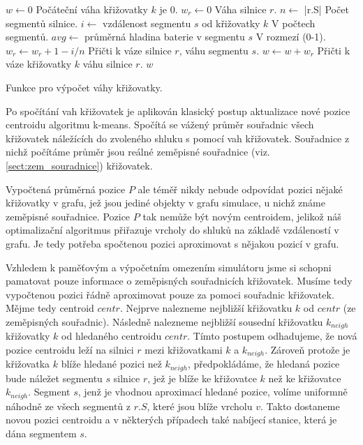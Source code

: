 \begin{algorithm}
\begin{algorithmic}
    \State $w \gets 0$ \Comment Počáteční váha křižovatky $k$ je 0.
        \State $w_r \gets 0$ \Comment Váha silnice $r$.
        \State $n \gets$ |r.S| \Comment Počet segmentů silnice.
            \State $i \gets$ vzdálenost segmentu $s$ od křižovatky $k$ \Comment V počtech segmentů.
            \State $avg \gets$ průměrná hladina baterie v segmentu $s$ \Comment V rozmezí (0-1).
            \State $w_r \gets w_r + 1 - i / n$ \Comment Přičti k váze silnice $r$, váhu segmentu $s$.
        \EndFor
        \State $w \gets w + w_r$ \Comment Přičti k váze křižovatky $k$ váhu silnice $r$.
    \EndFor
    \State \Return $w$

\EndFunction
\end{algorithmic}
\caption{Funkce pro výpočet váhy křižovatky.}
\label{alg:vert_weight}
\end{algorithm}


Po spočítání vah křižovatek je aplikován klasický postup aktualizace nové pozice 
centroidu algoritmu k-means. Spočítá se vážený průměr souřadnic všech křižovatek 
náležících do zvoleného shluku s pomocí vah křižovatek. Souřadnice z nichž 
počítáme průměr jsou reálné zeměpisné souřadnice (viz. \cref{sect:zem_souradnice}) 
křižovatek. 

Vypočtená průměrná pozice $P$ ale téměř nikdy nebude odpovídat pozici nějaké křižovatky
v grafu, jež jsou jediné objekty v grafu simulace, u nichž známe zeměpisné souřadnice.
Pozice $P$ tak nemůže být novým centroidem, jelikož náš optimalizační algoritmus
přiřazuje vrcholy do shluků na základě vzdáleností v grafu. Je tedy potřeba 
spočtenou pozici aproximovat s nějakou pozicí v grafu.

Vzhledem k paměťovým a výpočetním omezením simulátoru jsme si schopni pamatovat
pouze informace o zeměpisných souřadnicích křižovatek. Musíme tedy vypočtenou pozici 
řádně aproximovat pouze za pomoci souřadnic křižovatek. Mějme tedy centroid $centr$.
Nejprve nalezneme nejbližší křižovatku $k$ od $centr$ (ze zeměpisných souřadnic).
Následně nalezneme nejbližší sousední křižovatku $k_{neigh}$ křižovatky $k$ od
hledaného centroidu $centr$. Tímto postupem odhadujeme, že nová pozice centroidu 
leží na silnici $r$ mezi křižovatkami $k$ a $k_{neigh}$. Zároveň protože 
je křižovatka $k$ blíže hledané pozici než $k_{neigh}$, předpokládáme, že
hledaná pozice bude náležet segmentu $s$ silnice $r$, jež je blíže ke křižovatce
$k$ než ke křižovatce $k_{neigh}$. Segment $s$, jenž je vhodnou aproximací 
hledané pozice, volíme uniformně náhodně ze všech segmentů z $r.S$, které
jsou blíže vrcholu $v$. Takto dostaneme novou pozici centroidu a v některých
případech také nabíjecí stanice, která je dána segmentem $s$.

